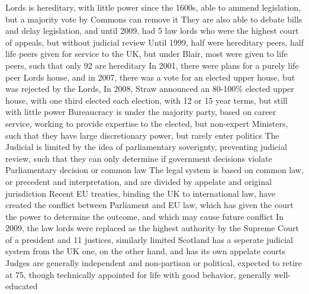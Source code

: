 \documentclass[11 pt, twoside]{article}
\newenvironment{outline*}
{
	\begin{outline}[enumerate]
	}
	{\end{outline}
}
\begin{document}
\begin{outline*}
\2 Lords is hereditary, with little power since the 1600s, able to ammend legislation, but a majority vote by Commons can remove it
\3 They are also able to debate bills and delay legislation, and until 2009, had 5 law lords who were the highest court of appeals, but without judicial review
\3 Until 1999, half were hereditary peers, half life peers given for service to the UK, but under Blair, most were given to life peers, such that only 92 are hereditary
\4 In 2001, there were plans for a purely life peer Lords house, and in 2007, there was a vote for an elected upper house, but was rejected by the Lords,
\4 In 2008, Straw announced an 80-100\% elected upper house, with one third elected each election, with 12 or 15 year terms, but still with little power
\2 Bureaucracy is under the majority party, based on career service, working to provide expertise to the elected, but non-expert Ministers, such that they have large discretionary power, but rarely enter politics
\1 The Judicial is limited by the idea of parliamentary soverignty, preventing judicial review, such that they can only determine if government decisions violate Parliamentary decision or common law
\2 The legal system is based on common law, or precedent and interpretation, and are divided by appelate and original jurisdiction
\3 Recent EU treaties, binding the UK to international law, have created the conflict between Parliament and EU law, which has given the court the power to determine the outcome, and which may cause future conflict
\2 In 2009, the law lords were replaced as the highest authority by the Supreme Court of a president and 11 justices, similarly limited
\2 Scotland has a seperate judicial system from the UK one, on the other hand, and has its own appelate courts
\2 Judges are generally independent and non-partisan or political, expected to retire at 75, though technically appointed for life with good behavior, generally well-educated
\end{outline*}
\end{document}
